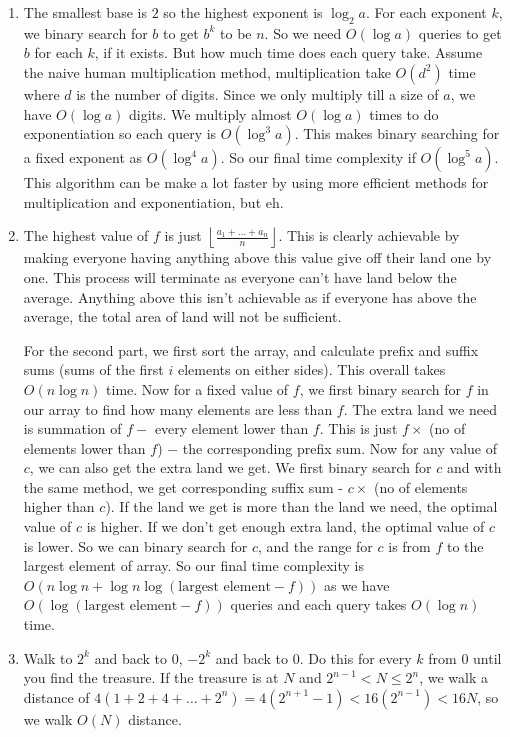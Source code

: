 \documentclass[12pt]{report}
\begin{document}
\begin{enumerate}[label=\textbf{\arabic*.}]
  \item The smallest base is $2$ so the highest exponent is $\log_2 a$. For each exponent $k$, we binary search for $b$
  to get $b^k$ to be $n$. So we need $O(\log a)$ queries to get $b$ for each $k$, if it exists. But how much time
  does each query take. Assume the naive human multiplication method, multiplication take $O(d^2)$ time where $d$
  is the number of digits. Since we only multiply till a size of $a$, we have $O(\log a)$ digits. We multiply
  almost $O(\log a)$ times to do exponentiation so each query is $O(\log^3 a)$. This makes binary searching for a 
  fixed exponent as $O(\log^4 a)$. So our final time complexity if $O(\log^5 a)$. This algorithm can be make a lot 
  faster by using more efficient methods for multiplication and exponentiation, but eh.

  \item The highest value of $f$ is just $\left \lfloor \frac{a_1 + \dots + a_n}{n} \right \rfloor$. This is clearly
  achievable by making everyone having anything above this value give off their land one by one. This process will 
  terminate as everyone can't have land below the average. Anything above this isn't achievable as if everyone has 
  above the average, the total area of land will not be sufficient.

  For the second part, we first sort the array, and calculate prefix and suffix sums (sums of the first $i$ elements
  on either sides). This overall takes $O(n \log n)$ time. Now for a fixed value of $f$, we first binary search for 
  $f$ in our array to find how many elements are less than $f$. The extra land we need is summation of $f - $ every
  element lower than $f$. This is just $f \times$ (no of elements lower than $f$) $-$ the corresponding prefix sum.
  Now for any value of $c$, we can also get the extra land we get. We first binary search for $c$ and with the same 
  method, we get corresponding suffix sum - $c \times$ (no of elements higher than $c$). If the land we get is more 
  than the land we need, the optimal value of $c$ is higher. If we don't get enough extra land, the optimal value of 
  $c$ is lower. So we can binary search for $c$, and the range for $c$ is from $f$ to the largest element of array.
  So our final time complexity is $O(n \log n + \log n \log (\text{largest element} - f))$ as we have 
  $ O(\log (\text{largest element} - f))$ queries and each query takes $O(\log n)$ time.

  \item Walk to $2^k$ and back to $0$, $-2^k$ and back to $0$. Do this for every $k$ from $0$ until you find the
  treasure. If the treasure is at $N$ and $2^{n-1} < N \leq 2^n$, we walk a distance of $4(1+2+4+\dots+2^n) = 
  4(2^{n+1} -1) < 16(2^{n-1}) < 16N$, so we walk $O(N)$ distance.


\end{enumerate}
\end{document}
